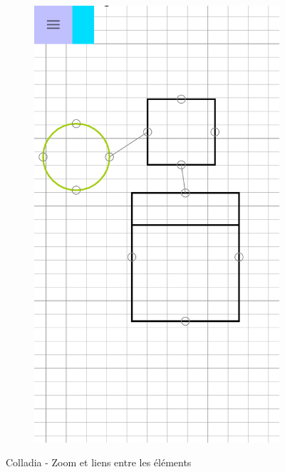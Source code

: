 \begin{itemize}
\begin{figure}[!h]
\begin{subfigure}[t]{.27\textwidth}
				\includegraphics[width=\textwidth]{img/screen/colladia_draw_view_element_links}
			\end{subfigure}
			\caption{Colladia - Zoom et liens entre les éléments}
		\end{figure}
\end{itemize}

\newpage
